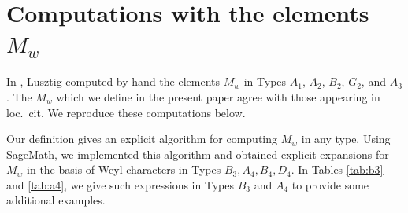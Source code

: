 \documentclass{amsart}
\theoremstyle{definition}
\begin{document}
\section{Computations with the elements $M_w$}

In \cite[Section 2]{L}, Lusztig computed by hand the elements $M_w$ in Types $A_1$, $A_2$, $B_2$, $G_2$, and $A_3$. The $M_w$ which we define in the present paper agree with those appearing in loc.\ cit. We reproduce these computations below.

Our definition gives an explicit algorithm for computing $M_w$ in any type. Using SageMath, we implemented this algorithm and obtained explicit expansions for $M_w$ in the basis of Weyl characters in Types $B_3, A_4, B_4, D_4$. In Tables \ref{tab:b3} and \ref{tab:a4}, we give such expressions in Types $B_3$ and $A_4$ to provide some additional examples.
\end{document}
